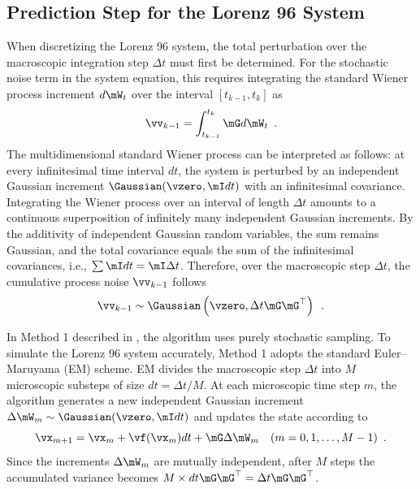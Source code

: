 \clearpage

\subsection{Prediction Step for the Lorenz 96 System}
\label{subsec:lorenz96_prediction}

When discretizing the Lorenz 96 system, the total perturbation over the macroscopic integration step $\Delta t$ must first be determined. For the stochastic noise term in the system equation, this requires integrating the standard Wiener process increment $d\mW_t$ over the interval $[t_{k-1}, t_k]$ as
\begin{equation}
	\vv_{k-1} = \int_{t_{k-1}}^{t_k} \mG d\mW_t \enspace .
\end{equation}
The multidimensional standard Wiener process can be interpreted as follows: at every infinitesimal time interval $dt$, the system is perturbed by an independent Gaussian increment $\Gaussian(\vzero, \mI dt)$ with an infinitesimal covariance. Integrating the Wiener process over an interval of length $\Delta t$ amounts to a continuous superposition of infinitely many independent Gaussian increments. By the additivity of independent Gaussian random variables, the sum remains Gaussian, and the total covariance equals the sum of the infinitesimal covariances, i.e., $\sum \mI dt = \mI \Delta t$. Therefore, over the macroscopic step $\Delta t$, the cumulative process noise $\vv_{k-1}$ follows
\begin{equation}
	\vv_{k-1} \sim \Gaussian\left(\vzero, \Delta t \mG \mG^{\top}\right) \enspace .
\end{equation}

In Method 1 described in , the algorithm uses purely stochastic sampling. To simulate the Lorenz 96 system accurately, Method 1 adopts the standard Euler--Maruyama (EM) scheme. EM divides the macroscopic step $\Delta t$ into $M$ microscopic substeps of size $dt = \Delta t / M$. At each microscopic time step $m$, the algorithm generates a new independent Gaussian increment $\Delta \mW_m \sim \Gaussian(\vzero, \mI dt)$ and updates the state according to
\begin{equation}
	\vx_{m+1} = \vx_m + \vf(\vx_m)dt + \mG\Delta \mW_m \quad (m = 0, 1, \dots, M-1) \enspace .
\end{equation}
Since the increments $\Delta \mW_m$ are mutually independent, after $M$ steps the accumulated variance becomes $M \times dt \mG\mG^{\top} = \Delta t \mG\mG^{\top}$.

